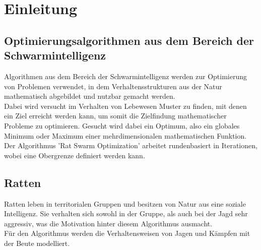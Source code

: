 \chapter{Einleitung}

\section{Optimierungsalgorithmen aus dem Bereich der Schwarmintelligenz}
Algorithmen aus dem Bereich der Schwarmintelligenz werden zur Optimierung von Problemen verwendet, in dem Verhaltensstrukturen aus der Natur mathematisch abgebildet und nutzbar gemacht werden.\\
Dabei wird versucht im Verhalten von Lebewesen Muster zu finden, mit denen ein Ziel erreicht werden kann, um somit die Zielfindung mathematischer Probleme zu optimieren. Gesucht wird dabei ein Optimum, also ein globales Minimum oder Maximum einer mehrdimensionalen mathematischen Funktion.\\
Der Algorithmus 'Rat Swarm Optimization' arbeitet rundenbasiert in Iterationen, wobei eine Obergrenze definiert werden kann.

\section{Ratten}
Ratten leben in territorialen Gruppen und besitzen von Natur aus eine soziale Intelligenz. Sie verhalten sich sowohl in der Gruppe, als auch bei der Jagd sehr aggressiv, was die Motivation hinter diesem Algorithmus ausmacht.\\
Für den Algorithmus werden die Verhaltensweisen von Jagen und Kämpfen mit der Beute modelliert. 